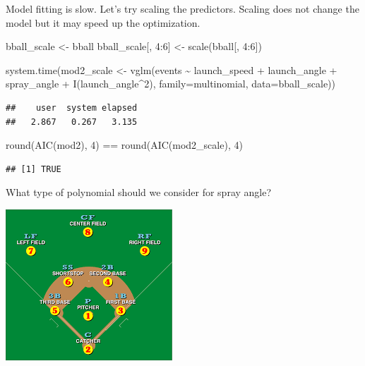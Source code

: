 \documentclass[
  ignorenonframetext,
]{beamer}
\newenvironment{Shaded}{\begin{snugshade}}{\end{snugshade}}
\newcommand{\AttributeTok}[1]{\textcolor[rgb]{0.77,0.63,0.00}{#1}}
\newcommand{\DecValTok}[1]{\textcolor[rgb]{0.00,0.00,0.81}{#1}}
\newcommand{\FunctionTok}[1]{\textcolor[rgb]{0.00,0.00,0.00}{#1}}
\newcommand{\NormalTok}[1]{#1}
\newcommand{\OtherTok}[1]{\textcolor[rgb]{0.56,0.35,0.01}{#1}}
\newcommand{\SpecialCharTok}[1]{\textcolor[rgb]{0.00,0.00,0.00}{#1}}
\begin{document}
\begin{frame}[fragile]{}
\protect\hypertarget{section-9}{}
Model fitting is slow. Let's try scaling the predictors. Scaling does
not change the model but it may speed up the optimization.

\vspace{12pt}
\tiny

\begin{Shaded}
\begin{Highlighting}[]
\NormalTok{bball\_scale }\OtherTok{\textless{}{-}}\NormalTok{ bball}
\NormalTok{bball\_scale[, }\DecValTok{4}\SpecialCharTok{:}\DecValTok{6}\NormalTok{] }\OtherTok{\textless{}{-}} \FunctionTok{scale}\NormalTok{(bball[, }\DecValTok{4}\SpecialCharTok{:}\DecValTok{6}\NormalTok{])}

\FunctionTok{system.time}\NormalTok{(mod2\_scale }\OtherTok{\textless{}{-}} \FunctionTok{vglm}\NormalTok{(events }\SpecialCharTok{\textasciitilde{}}\NormalTok{ launch\_speed }\SpecialCharTok{+}\NormalTok{ launch\_angle }\SpecialCharTok{+} 
\NormalTok{    spray\_angle }\SpecialCharTok{+}  \FunctionTok{I}\NormalTok{(launch\_angle}\SpecialCharTok{\^{}}\DecValTok{2}\NormalTok{), }
    \AttributeTok{family=}\NormalTok{multinomial, }\AttributeTok{data=}\NormalTok{bball\_scale))}
\end{Highlighting}
\end{Shaded}

\begin{verbatim}
##    user  system elapsed 
##   2.867   0.267   3.135
\end{verbatim}

\begin{Shaded}
\begin{Highlighting}[]
\FunctionTok{round}\NormalTok{(}\FunctionTok{AIC}\NormalTok{(mod2), }\DecValTok{4}\NormalTok{) }\SpecialCharTok{==} \FunctionTok{round}\NormalTok{(}\FunctionTok{AIC}\NormalTok{(mod2\_scale), }\DecValTok{4}\NormalTok{)}
\end{Highlighting}
\end{Shaded}

\begin{verbatim}
## [1] TRUE
\end{verbatim}
\end{frame}

\begin{frame}{}
\protect\hypertarget{section-10}{}
What type of polynomial should we consider for spray angle?
\end{frame}

\begin{frame}{}
\protect\hypertarget{section-11}{}
\includegraphics{positions.png}
\end{frame}
\end{document}
